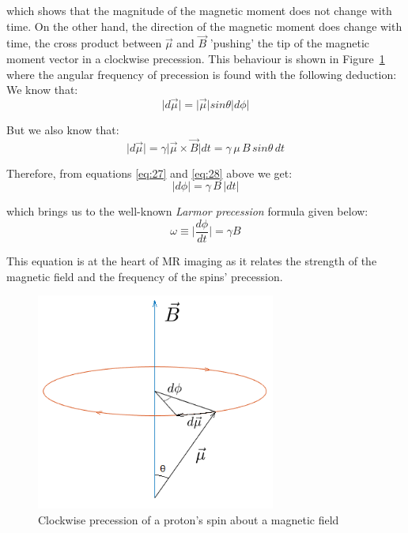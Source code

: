 which shows that the magnitude of the magnetic moment does not change with time. On the other hand, the direction of the magnetic moment does change with time, the cross product between $\vec{\mu}$ and $\vec{B}$ 'pushing' the tip of the magnetic moment vector in a clockwise precession. This behaviour is shown in Figure~\ref{fig:21} where the angular frequency of precession is found with the following deduction: \\

We know that:
\begin{equation} \label{eq:27}
    \lvert d\vec{\mu} \rvert = 
        \lvert \vec{\mu} \rvert sin \theta \lvert d \phi \rvert 
\end{equation}

But we also know that:
\begin{equation} \label{eq:28}
    \lvert d\vec{\mu} \rvert = 
        \gamma \lvert \vec{\mu} \times \vec{B} \rvert dt = 
        \gamma \, \mu \, B \, sin \theta \, dt 
\end{equation}

Therefore, from equations \ref{eq:27} and \ref{eq:28} above we get:
\begin{equation} \label{eq:29}
    \lvert d\phi \rvert = \gamma \, B \, \lvert dt \rvert
\end{equation}

which brings us to the well-known \textit{Larmor precession} formula given below:
\begin{equation} \label{eq:210}
    \omega \equiv \lvert \frac{d\phi}{dt} \rvert = \gamma B
\end{equation}

This equation is at the heart of MR imaging as it relates the strength of the magnetic field and the frequency of the spins' precession. 

\begin{figure}[ht]
    \centering
    \includegraphics[width=0.7\textwidth,keepaspectratio]{precession}
    \caption{Clockwise precession of a proton's spin about a magnetic field}
    \label{fig:21}
\end{figure}

